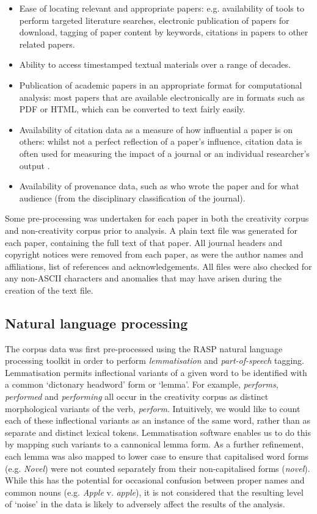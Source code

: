 \documentclass[10pt,letterpaper]{article}
\begin{document}
\begin{itemize}
\item Ease of locating relevant and appropriate papers: e.g. availability of tools to perform targeted literature searches, electronic publication of papers for download, tagging of paper content by keywords, citations in papers to other related papers.
\item Ability to access timestamped textual materials over a range of decades.
\item Publication of academic papers in an appropriate format for computational analysis: most papers that are available electronically are in formats such as PDF or HTML, which can be converted to text fairly easily.
\item Availability of citation data as a measure of how influential a paper is on others: whilst not a perfect reflection of a paper's influence, citation data is often used for measuring the impact of a journal \cite{garfield72} or an individual researcher's output \cite{hirsch05}.
\item Availability of provenance data, such as who wrote the paper and for what audience (from the disciplinary classification of the journal).
\end{itemize}
\noindent 

Some pre-processing was undertaken for each paper in both the creativity corpus and non-creativity corpus prior to analysis. A plain text file was generated for each paper, containing the full text of that paper. All journal headers and copyright notices were removed from each paper, as were the author names and affiliations, list of references and acknowledgements. All files were also checked for any non-ASCII characters and anomalies that may have arisen during the creation of the text file.

\subsection*{Natural language processing}

The corpus data was first pre-processed using the RASP natural language processing toolkit \cite{briscoe06} in order to perform {\em lemmatisation} and {\em part-of-speech} tagging.  Lemmatisation permits inflectional variants of a given word to be identified with a common `dictonary headword' form or `lemma'.  For example,  {\em performs\/}, {\em performed\/}  and {\em performing\/} all occur in the creativity corpus as distinct morphological variants of  the  verb, {\em perform\/}.  Intuitively, we would like to count each of these inflectional variants as an instance of the same word, rather than as separate and distinct lexical tokens. Lemmatisation software enables us to do this by mapping such variants to a cannonical lemma form. As a further refinement, each lemma was also mapped to lower case to ensure that capitalised word forms (e.g. {\em Novel\/}) were not counted separately from their non-capitalised forms ({\em novel\/}). While this has the potential for occasional confusion between proper names and common nouns (e.g. {\em Apple\/} v. {\em apple\/}), it is not considered that the resulting level of `noise'  in the data is likely to adversely affect the results of the analysis.
\end{document}

